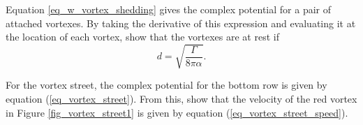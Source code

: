 \begin{problem}
\label{prob_attached_vortexes}
Equation \ref{eq_w_vortex_shedding} gives the complex potential for a pair of attached vortexes.  By taking the derivative of this expression and evaluating it at the location of each vortex, show that the vortexes are at rest if
\[
d = \sqrt{\frac{\Gamma}{8\pi \alpha}}.
\]
\end{problem}

 
\begin{problem}
\label{prob_vortex_street}
For the vortex street, the complex potential for the bottom row is given by equation (\ref{eq_vortex_street}).  From this, show that the velocity of the red vortex in Figure \ref{fig_vortex_street1} is given by equation (\ref{eq_vortex_street_speed}).
\end{problem}


